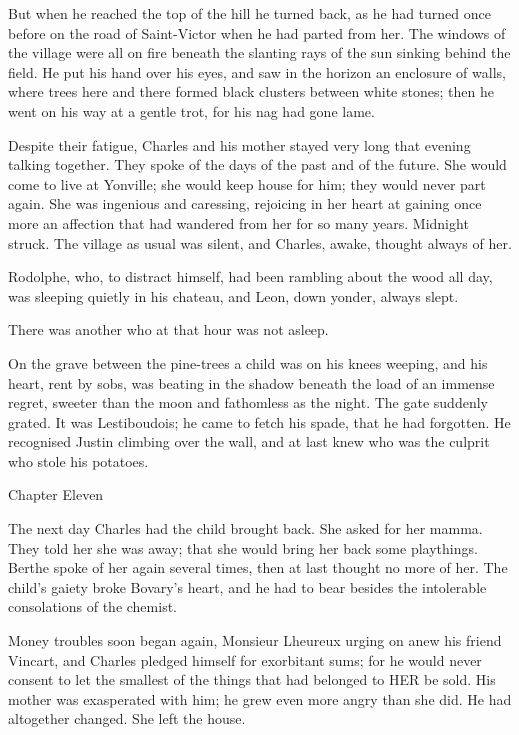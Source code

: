 \documentclass[11pt,twocolumn]{ltugboat}
\begin{document}
But when he reached the top of the hill he turned back, as he had turned
once before on the road of Saint-Victor when he had parted from her. The
windows of the village were all on fire beneath the slanting rays of the
sun sinking behind the field. He put his hand over his eyes, and saw
in the horizon an enclosure of walls, where trees here and there formed
black clusters between white stones; then he went on his way at a gentle
trot, for his nag had gone lame.

Despite their fatigue, Charles and his mother stayed very long that
evening talking together. They spoke of the days of the past and of the
future. She would come to live at Yonville; she would keep house for
him; they would never part again. She was ingenious and caressing,
rejoicing in her heart at gaining once more an affection that had
wandered from her for so many years. Midnight struck. The village as
usual was silent, and Charles, awake, thought always of her.

Rodolphe, who, to distract himself, had been rambling about the wood all
day, was sleeping quietly in his chateau, and Leon, down yonder, always
slept.

There was another who at that hour was not asleep.

On the grave between the pine-trees a child was on his knees weeping,
and his heart, rent by sobs, was beating in the shadow beneath the load
of an immense regret, sweeter than the moon and fathomless as the night.
The gate suddenly grated. It was Lestiboudois; he came to fetch his
spade, that he had forgotten. He recognised Justin climbing over the
wall, and at last knew who was the culprit who stole his potatoes.



Chapter Eleven

The next day Charles had the child brought back. She asked for her
mamma. They told her she was away; that she would bring her back some
playthings. Berthe spoke of her again several times, then at last
thought no more of her. The child's gaiety broke Bovary's heart, and he
had to bear besides the intolerable consolations of the chemist.

Money troubles soon began again, Monsieur Lheureux urging on anew his
friend Vincart, and Charles pledged himself for exorbitant sums; for he
would never consent to let the smallest of the things that had belonged
to HER be sold. His mother was exasperated with him; he grew even more
angry than she did. He had altogether changed. She left the house.
\end{document}
